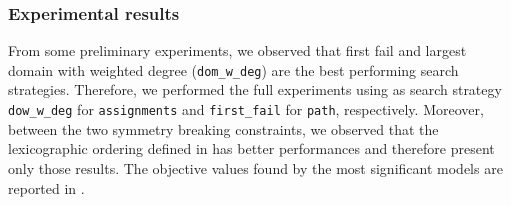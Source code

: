 \subsubsection{Experimental results}

From some preliminary experiments, we observed that first fail and largest domain with weighted degree (\texttt{dom\_w\_deg}) are the best performing search strategies. Therefore, we performed the full experiments using as search strategy \texttt{dow\_w\_deg} for \texttt{assignments} and \texttt{first\_fail} for \texttt{path}, respectively. Moreover, between the two symmetry breaking constraints, we observed that the lexicographic ordering defined in  has better performances and therefore present only those results. The objective values found by the most significant models are reported in .

